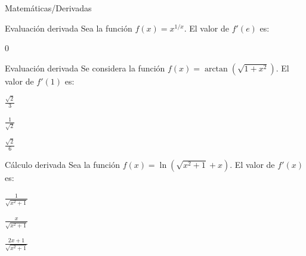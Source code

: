 \documentclass[12pt]{article}
\begin{document}
\begin{quiz}{Matemáticas/Derivadas}
	 \begin{numerical}[shuffle=true,numbering=none, feedback={
		 La función derivada es $f'(x)=\frac{1}{x^2}x^{1/x}(1-\log(x))$. Por tanto, $f'(e)=0$.
		 }]{Evaluación derivada}
			Sea la función $f(x)=x^{1/x}$. El valor de $f'(e)$ es:
		 \item 0
	 \end{numerical}
	 
	 \begin{multi}[shuffle=true,numbering=none, feedback={
		 La función derivada es $f'(x)=\frac{x}{(x^2+2) \, \sqrt{1+x^2}}$ , por lo que $f'(1)=\frac{1}{3\, \sqrt{2}}= \frac{\sqrt{2}}{6}$.
	 }]{Evaluación derivada}
		 Se considera la función $f(x)=\arctan(\sqrt{1+x^2})$. El valor de $f'(1)$ es:
	 
		\item $\frac{\sqrt{2}}{3}$  
		\item $\frac{1}{\sqrt{2}}$   
		\item* $\frac{\sqrt{2}}{6}$
	 \end{multi}

	 \begin{multi}[shuffle=true,numbering=none, feedback={
			La función derivada es $f'(x)=\frac{1}{\sqrt{x^2+1}}$. Por tanto, $f'(1)=\frac{1}{\sqrt{2}}$.
		}]{Cálculo derivada} Sea la función $f(x)=\ln\left(\sqrt{x^2+1}+x\right)$. El valor de $f'(x)$ es:
		\item* $\frac{1}{\sqrt{x^2+1}}$
		\item $\frac{x}{\sqrt{x^2+1}}$
		\item $\frac{2x+1}{\sqrt{x^2+1}}$
	\end{multi}
\end{quiz}
\end{document}
